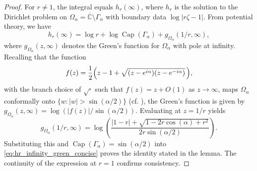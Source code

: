 \documentclass[12pt,oneside,reqno]{amsart}
\theoremstyle{definition}
\numberwithin{equation}{section}
\newcommand{\C}{{\mathbb C}}
\renewcommand{\Cap}{\operatorname{Cap}}
\begin{document}
\begin{proof}
For $r\neq 1$, the integral equals $h_r(\infty)$, where $h_r$ is the solution to the Dirichlet problem on $\Omega_\alpha = \overline{\C}\setminus\Gamma_\alpha$ with boundary data $\log|r\zeta-1|$. From potential theory, %
we have
\begin{equation}
\label{eq:hr_infinity_green_concise}
h_r(\infty) = \log r + \log\Cap(\Gamma_\alpha) + g_{\Omega_\alpha}(1/r,\infty),
\end{equation}
where $g_{\Omega_\alpha}(z,\infty)$ denotes the Green's function for $\Omega_\alpha$ with pole at infinity. Recalling that the function
\[
f(z) = \frac{1}{2} \Bigl( z-1+\sqrt{ (z-e^{i\alpha})(z-e^{-i\alpha}) } \,\Bigr),
\]
with the branch choice of $\sqrt{\cdot}$ such that $f(z) = z + O(1)$ as $z\to\infty$, maps $\Omega_\alpha$ conformally onto $\{w : |w| > \sin(\alpha/2)\}$ (cf. \cite[Exercise 5.2.4]{ransford95}), the Green's function is given by $g_{\Omega_\alpha}(z, \infty) = \log\left({|f(z)|}/{\sin(\alpha/2)}\right)$.
Evaluating at $z=1/r$ yields
\begin{equation}
\label{2.10}
g_{\Omega_\alpha}(1/r, \infty) %
= \log\left( \frac{\vert 1-r \vert + \sqrt{1-2r\cos(\alpha)+r^2}}{2r\sin(\alpha/2)} \right).
\end{equation}
Substituting this and $\Cap(\Gamma_\alpha)=\sin(\alpha/2)$ into \eqref{eq:hr_infinity_green_concise} %
proves the identity stated in the lemma. The continuity of the expression at $r=1$ confirms consistency.
%
\end{proof}
\end{document}
